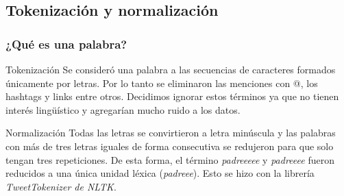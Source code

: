 
\subsection{Tokenización y normalización}

\begin{frame}[t]\frametitle{¿Qué es una palabra?}
    \begin{block}{Tokenización}
    Se consideró una palabra a las secuencias de caracteres formados únicamente por letras. Por lo tanto se eliminaron las menciones con @, los hashtags y links entre otros. Decidimos ignorar estos términos ya que no tienen interés lingüístico y agregarían mucho ruido a los datos.
    \end{block}

    \begin{block}{Normalización}
    Todas las letras se convirtieron a letra minúscula y las palabras con más de tres letras iguales de forma consecutiva se redujeron para que solo tengan tres repeticiones. De esta forma, el término \textit{padreeeee} y \textit{padreeee} fueron reducidos a una única unidad léxica (\textit{padreee}). Esto se hizo con la librería \textit{TweetTokenizer de NLTK}. 
    \end{block}

\end{frame}
